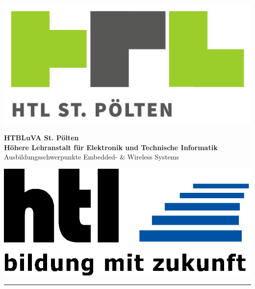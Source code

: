\begin{inhalt}
\clearpage
\thispagestyle{empty} %
\begin{center}



\begin{center}
    \vspace*{-15mm}
    \begin{minipage}[t]{\textwidth}
        \begin{minipage}[c]{0.1\textwidth}
            \hspace*{-5mm}
            \includegraphics[width=1.5\linewidth]{doc/img/htl.png}
        \end{minipage}%
        \begin{minipage}[c]{0.8\textwidth}
            \centering
            {\bfseries\sffamily\large HTBLuVA St. Pölten}\\
            \vspace{1.5mm}
            {\bfseries\sffamily\small Höhere Lehranstalt für Elektronik und Technische Informatik}\\
            \vspace{1.5mm}
            {\sffamily\scriptsize Ausbildungsschwerpunkte Embedded- \& Wireless Systems}\\
            \vspace{1.5mm}
        \end{minipage}%
        \begin{minipage}[c]{0.1\textwidth}
            \hspace*{-2mm}
            \includegraphics[width=1.5\linewidth]{doc/img/htl-bbs.png}
        \end{minipage}
    \end{minipage}
    \rule{\textwidth}{0.2pt}
    \vspace{0.5cm}


\end{center}
\end{center}
\end{inhalt}
